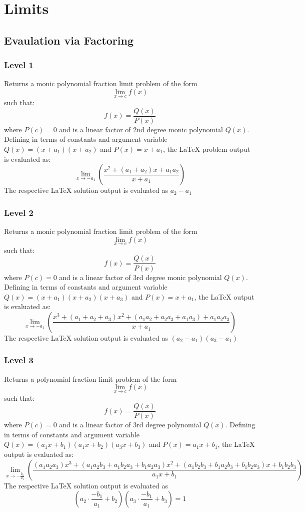 \documentclass[12pt,a4paper]{article}
\begin{document}
  \section{Limits}
  \subsection{Evaulation via Factoring}
  \setcounter{subsubsection}{-1}
  \subsubsection{Level 1}
  Returns a monic polynomial fraction limit problem of the form \[\lim_{x\to{c}}f(x)\] such that: \[f(x)=\frac{Q(x)}{P(x)}\] where \(P(c) = 0\) and is a linear factor of 2nd degree monic polynomial \(Q(x)\).
  Defining in terms of constants and argument variable \(Q(x)=\left(x+a_1\right)\left(x+a_2\right)\) and \(P(x)=x+a_1\), the \LaTeX{} problem output is evaluated as: \[\lim_{x\to{-a_1}}\left(\frac{x^2+\left(a_1+a_2\right)x+a_1a_2}{x+a_1}\right)\]
  The respective \LaTeX{} solution output is evaluated as \(a_2-a_1\)
  \subsubsection{Level 2}
  Returns a monic polynomial fraction limit problem of the form \[\lim_{x\to{c}}f(x)\] such that: \[f(x)=\frac{Q(x)}{P(x)}\] where \(P(c) = 0\) and is a linear factor of 3rd degree monic polynomial \(Q(x)\).
  Defining in terms of constants and argument variable \(Q(x)=\left(x+a_1\right)\left(x+a_2\right)\left(x+a_3\right)\) and \(P(x)=x+a_1\), the \LaTeX{} output is evaluated as: \[\lim_{x\to{-a_1}}\left(\frac{x^3+\left(a_1+a_2+a_3\right)x^2+\left(a_1a_2+a_2a_3+a_1a_3\right)+a_1a_2a_3}{x+a_1}\right)\]
  The respective \LaTeX{} solution output is evaluated as \(\left(a_2-a_1\right)\left(a_3-a_1\right)\)
  \subsubsection{Level 3}
  Returns a polynomial fraction limit problem of the form \[\lim_{x\to{c}}f(x)\] such that: \[f(x)=\frac{Q(x)}{P(x)}\] where \(P(c) = 0\) and is a linear factor of 3rd degree polynomial \(Q(x)\).
  Defining in terms of constants and argument variable \(Q(x)=\left(a_1x+b_1\right)\left(a_1x+b_2\right)\left(a_3x+b_3\right)\) and \(P(x)=a_1x+b_1\), the \LaTeX{} output is evaluated as: \[\lim_{x\to{-\frac{b_1}{a_1}}}\left(\frac{\left(a_1a_2a_3\right)x^3+\left(a_1a_2b_3+a_1b_2a_3+b_1a_2a_3\right)x^2+\left(a_1b_2b_3+b_1a_2b_3+b_1b_2a_3\right)x+b_1b_2b_3}{a_1x+b_1}\right)\]
  The respective \LaTeX{} solution output is evaluated as \[\left(a_2\cdot\frac{-b_1}{a_1}+b_2\right)\left(a_3\cdot\frac{-b_1}{a_1}+b_3\right)=1\]
\end{document}
